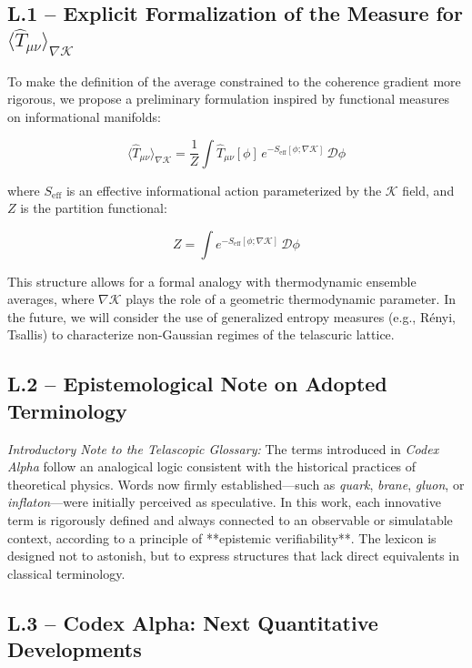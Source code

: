 \documentclass[12pt]{article}
\begin{document}
\subsection*{L.1 – Explicit Formalization of the Measure for $\langle \hat{T}_{\mu\nu} \rangle_{\nabla \mathcal{K}}$}

To make the definition of the average constrained to the coherence gradient more rigorous, we propose a preliminary formulation inspired by functional measures on informational manifolds:

\[
\langle \hat{T}_{\mu\nu} \rangle_{\nabla \mathcal{K}} = \frac{1}{Z} \int \hat{T}_{\mu\nu}[\phi] \, e^{-S_\text{eff}[\phi; \nabla \mathcal{K}]} \, \mathcal{D}\phi
\]

where $S_\text{eff}$ is an effective informational action parameterized by the $\mathcal{K}$ field, and $Z$ is the partition functional:

\[
Z = \int e^{-S_\text{eff}[\phi; \nabla \mathcal{K}]} \, \mathcal{D}\phi
\]

This structure allows for a formal analogy with thermodynamic ensemble averages, where $\nabla \mathcal{K}$ plays the role of a geometric thermodynamic parameter. In the future, we will consider the use of generalized entropy measures (e.g., Rényi, Tsallis) to characterize non-Gaussian regimes of the telascuric lattice.

\subsection*{L.2 – Epistemological Note on Adopted Terminology}

\textit{Introductory Note to the Telascopic Glossary:}  
The terms introduced in \textit{Codex Alpha} follow an analogical logic consistent with the historical practices of theoretical physics. Words now firmly established—such as \textit{quark}, \textit{brane}, \textit{gluon}, or \textit{inflaton}—were initially perceived as speculative.  
In this work, each innovative term is rigorously defined and always connected to an observable or simulatable context, according to a principle of **epistemic verifiability**. The lexicon is designed not to astonish, but to express structures that lack direct equivalents in classical terminology.

\subsection*{L.3 – Codex Alpha: Next Quantitative Developments}
\end{document}
